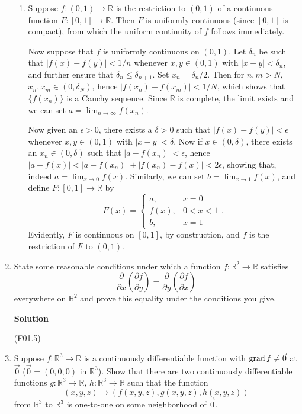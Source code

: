 \documentclass{article}
\def\grad{\mathop{\rm grad}\nolimits}
\begin{document}
\begin{enumerate}
\begin{enumerate}
\item Suppose \(f : (0,1) \to \mathbb{R}\) is the restriction to \((0,1)\) of a continuous function \(F : [0,1] \to \mathbb{R}\).  Then \(F\) is uniformly continuous (since \([0,1]\) is compact), from which the uniform continuity of \(f\) follows immediately.

Now suppose that \(f\) is uniformly continuous on \((0,1)\).  Let \(\delta_n\) be such that \(|f(x) - f(y)| < 1/n\) whenever \(x,y \in (0,1)\) with \(|x - y| < \delta_n\), and further ensure that \(\delta_n \leq \delta_{n + 1}\).  Set \(x_n = \delta_n / 2\).  Then for \(n,m > N\), \(x_n,x_m \in (0,\delta_N)\), hence \(|f(x_n) - f(x_m)| < 1/N\), which shows that \(\{f(x_n)\}\) is a Cauchy sequence.  Since \(\mathbb{R}\) is complete, the limit exists and we can set \(a = \lim_{n \to \infty} f(x_n)\).

Now given an \(\epsilon > 0\), there exists a \(\delta > 0\) such that \(|f(x) - f(y)| < \epsilon\) whenever \(x,y \in (0,1)\) with \(|x - y| < \delta\).  Now if \(x \in (0,\delta)\), there exists an \(x_n \in (0,\delta)\) such that \(|a - f(x_n)| < \epsilon\), hence \(|a - f(x)| < |a - f(x_n)| + |f(x_n) - f(x)| < 2\epsilon\), showing that, indeed \(a = \lim_{x \to 0} f(x)\).  Similarly, we can set \(b = \lim_{x \to 1} f(x)\), and define \(F : [0,1] \to \mathbb{R}\) by
\[F(x) = \begin{cases} a,    & x = 0 \\
                       f(x), & 0 < x < 1 \\
                       b,    & x = 1
         \end{cases}.\]
Evidently, \(F\) is continuous on \([0,1]\), by construction, and \(f\) is the restriction of \(F\) to \((0,1)\).

\end{enumerate}



\item State some reasonable conditions under which a function \(f : \mathbb{R}^2 \to \mathbb{R}\) satisfies
\[  \frac{\partial}{\partial x} \left( \frac{\partial f}{\partial y} \right)
  = \frac{\partial}{\partial y} \left( \frac{\partial f}{\partial x} \right)\]
everywhere on \(\mathbb{R}^2\) and prove this equality under the conditions you give.

{\bf Solution}

(F01.5)



\item Suppose \(f : \mathbb{R}^3 \to \mathbb{R}\) is a continuously differentiable function with \(\grad f \neq \vec{0}\) at \(\vec{0}\) (\(\vec{0} = (0,0,0)\) in \(\mathbb{R}^3\)).  Show that there are two continuously differentiable functions \(g : \mathbb{R}^3 \to \mathbb{R}\), \(h : \mathbb{R}^3 \to \mathbb{R}\) such that the function
\[(x,y,z) \mapsto (f(x,y,z), g(x,y,z), h(x,y,z))\]
from \(\mathbb{R}^3\) to \(\mathbb{R}^3\) is one-to-one on some neighborhood of \(\vec{0}\).


\end{enumerate}
\end{document}
